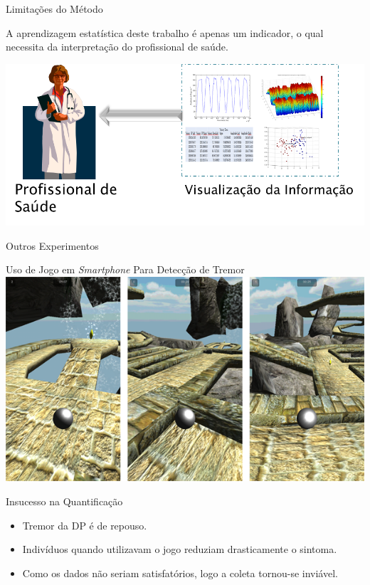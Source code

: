 \documentclass{beamer}
\begin{document}
\begin{frame}{Limitações do Método}
	\begin{block}{}
	A aprendizagem estatística deste trabalho é apenas um indicador, o qual necessita da interpretação do profissional de saúde.
	\end{block}
  \begin{block}{}
      \center \includegraphics[height=1 in]{img/visualizacaomedico.png}
  \end{block}
\end{frame}

\begin{frame}{Outros Experimentos}
	\begin{block}{Uso de Jogo em \textit{Smartphone} Para Detecção de Tremor}
	\center \includegraphics[height=1 in]{img/pinball_world.png}
	\end{block}
	\begin{block}{Insucesso na Quantificação}
			\begin{itemize}[<+->]
			\item Tremor da DP é de repouso.
			\item Indivíduos quando utilizavam o jogo reduziam drasticamente o sintoma.
			\item Como os dados não seriam satisfatórios, logo a coleta tornou-se inviável.
		\end{itemize}
	\end{block}
\end{frame}
\end{document}

